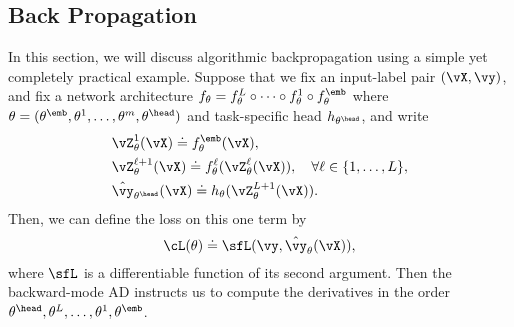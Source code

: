 \documentclass[../../book-main.tex]{subfiles}
\begin{document}
\subsection{Back Propagation}
\label{app:BP-section}
In this section, we will discuss algorithmic backpropagation using a simple yet completely practical example. Suppose that we fix an input-label pair \((\vX, \vy)\), and fix a network architecture \(f_{\theta} = f_{\theta}^{L} \circ \cdots \circ f_{\theta}^{1} \circ f_{\theta}^{\emb}\) where \(\theta = (\theta^{\emb}, \theta^{1}, \dots, \theta^{m}, \theta^{\head})\) and task-specific head \(h_{\theta^{\head}}\), and write
\begin{align}
    &\vZ_{\theta}^{1}(\vX) \doteq f_{\theta}^{\emb}(\vX), \\ 
    &\vZ_{\theta}^{\ell + 1}(\vX) \doteq f_{\theta}^{\ell}(\vZ_{\theta}^{\ell}(\vX)), \quad \forall \ell \in \{1, \dots, L\}, \\
    &\hat{\vy}_{\theta^{\head}}(\vX) \doteq h_{\theta}(\vZ_{\theta}^{L+1}(\vX)).
\end{align}
Then, we can define the loss on this one term by 
\begin{equation}
    \cL(\theta) \doteq \sfL(\vy, \hat{\vy}_{\theta}(\vX)),
\end{equation}
where \(\sfL\) is a differentiable function of its second argument. Then the backward-mode AD instructs us to compute the derivatives in the order \(\theta^{\head}, \theta^{L}, \dots, \theta^{1}, \theta^{\emb}\). 
\end{document}
